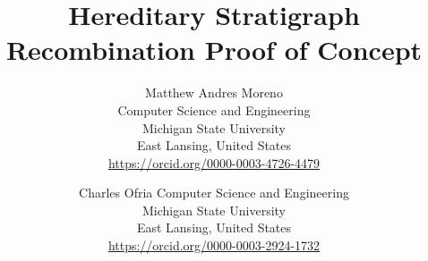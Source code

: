 \title{ Hereditary Stratigraph Recombination Proof of Concept }

\author{
Matthew Andres Moreno\\
Computer Science and Engineering \\
Michigan State University\\
East Lansing, United States \\
\url{https://orcid.org/0000-0003-4726-4479} \\
\and
Charles Ofria
Computer Science and Engineering \\
Michigan State University\\
East Lansing, United States \\
\url{https://orcid.org/0000-0003-2924-1732}
}

\maketitle
